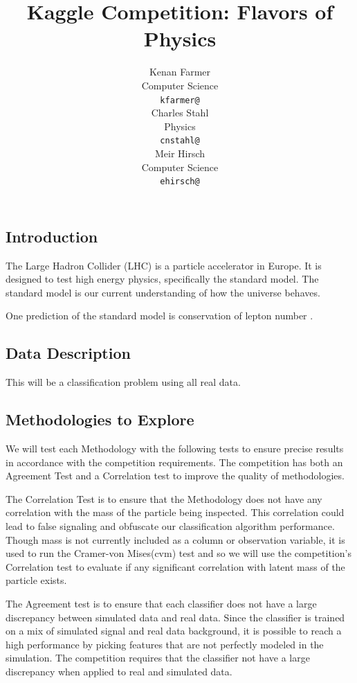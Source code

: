 \documentclass{article} %
\title{Kaggle Competition: Flavors of Physics}
\author{
Kenan Farmer\\
Computer Science\\
\texttt{kfarmer@} \\
\And
Charles Stahl \\
Physics \\
\texttt{cnstahl@} \\
\And
Meir Hirsch\\
Computer Science \\
\texttt{ehirsch@} \\
}
\begin{document}
\maketitle

\subsection*{Introduction}

The Large Hadron Collider (LHC) is a particle accelerator in Europe. It is designed to test high energy physics, specifically the standard model. The standard model is our current understanding of how the universe behaves. 

One prediction of the standard model is conservation of lepton number \cite{griff87}.

\subsection*{Data Description}

This will be a classification problem using all real data.

\subsection*{Methodologies to Explore}

We will test each Methodology with the following tests to ensure precise results in accordance with the competition requirements. The competition has both an Agreement Test and a Correlation test to improve the quality of methodologies.

The Correlation Test is to ensure that the Methodology does not have any correlation with the mass of the particle being inspected. This correlation could lead to false signaling and obfuscate our classification algorithm performance. Though mass is not currently included as a column or observation variable, it is used to run the Cramer-von Mises(cvm) test and so we will use the competition's Correlation test to evaluate if any significant correlation with latent mass of the particle exists.

The Agreement test is to ensure that each classifier does not have a large discrepancy between simulated data and real data. Since the classifier is trained on a mix of simulated signal and real data background, it is possible to reach a high performance by picking features that are not perfectly modeled in the simulation. The competition requires that the classifier not have a large discrepancy when applied to real and simulated data. \cite{}
\end{document}
